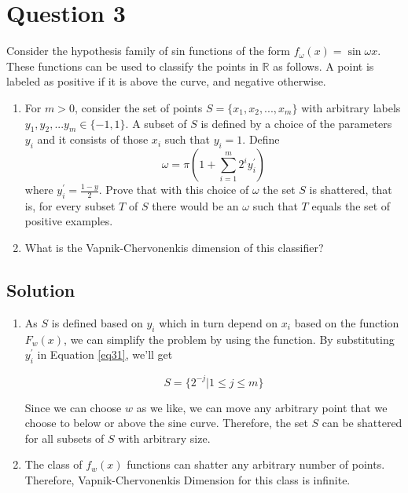 \section*{Question 3}

Consider the hypothesis family of sin functions of the form $f_\omega(x) = \sin \omega x$. These functions can be used to classify the points in $\mathbb{R}$ as follows. A point is labeled as positive if it is above the curve, and negative otherwise.
\begin{enumerate}[label=(\alph*)]
\item For $m > 0$, consider the set of points $S = \{x_1, x_2, ..., x_m\}$ with arbitrary labels $y_1, y_2, ... y_m \in \{-1, 1\}$. A subset of $S$ is defined by a choice of the parameters $y_i$ and it consists of those $x_i$ such that $y_i = 1$. Define
\begin{equation}\label{eq31}
\omega = \pi (1 + \sum_{i=1}^{m} 2^{i}y_{i}^{\prime})
\end{equation}
where $y_i^\prime = \frac{1-y}{2}$. Prove that with this choice of $\omega$ the set $S$ is shattered, that is, for every subset $T$ of $S$ there would be an $\omega$ such that $T$ equals the set of positive examples.

\item What is the Vapnik-Chervonenkis dimension of this classifier?
\end{enumerate}

\subsection*{Solution}

\begin{enumerate}
\item As $S$ is defined based on $y_i$ which in turn depend on $x_i$ based on the function $F_w(x)$, we can simplify the problem by using the function. By substituting $y_i^\prime$ in Equation \ref{eq31}, we'll get

\begin{equation}\label{eq32}
S = \{2 ^ {-j} | 1 \leq j \leq m\}
\end{equation}

Since we can choose $w$ as we like, we can move any arbitrary point that we choose to below or above the sine curve. Therefore, the set $S$ can be shattered for all subsets of $S$ with arbitrary size.

\item The class of $f_w(x)$ functions can shatter any arbitrary number of points. Therefore, Vapnik-Chervonenkis Dimension for this class is infinite.
\end{enumerate}
